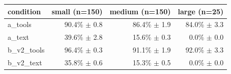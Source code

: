 \begin{tabular}{lrrr}
\toprule
condition & small (n=150) & medium (n=150) & large (n=25) \\
\midrule
a\_tools & 90.4\% $\pm$ 0.8 & 86.4\% $\pm$ 1.9 & 84.0\% $\pm$ 3.3 \\
a\_text & 39.6\% $\pm$ 2.8 & 15.6\% $\pm$ 0.3 & 0.0\% $\pm$ 0.0 \\
b\_v2\_tools & 96.4\% $\pm$ 0.3 & 91.1\% $\pm$ 1.9 & 92.0\% $\pm$ 3.3 \\
b\_v2\_text & 35.8\% $\pm$ 0.6 & 15.3\% $\pm$ 0.5 & 0.0\% $\pm$ 0.0 \\
\bottomrule
\end{tabular}
